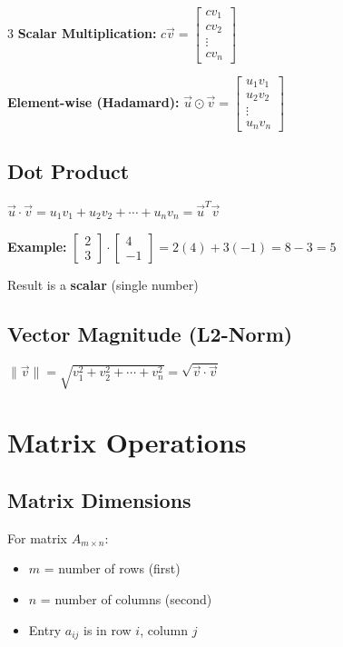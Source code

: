 \documentclass[10pt,landscape]{article}
\begin{document}
\begin{multicols*}{3}
\textbf{Scalar Multiplication:} $c\vec{v} = \begin{bmatrix} cv_1 \\ cv_2 \\ \vdots \\ cv_n \end{bmatrix}$

\textbf{Element-wise (Hadamard):} $\vec{u} \odot \vec{v} = \begin{bmatrix} u_1v_1 \\ u_2v_2 \\ \vdots \\ u_nv_n \end{bmatrix}$

\subsection*{Dot Product}
$\vec{u} \cdot \vec{v} = u_1v_1 + u_2v_2 + \cdots + u_nv_n = \vec{u}^T\vec{v}$

\textbf{Example:} $\begin{bmatrix} 2 \\ 3 \end{bmatrix} \cdot \begin{bmatrix} 4 \\ -1 \end{bmatrix} = 2(4) + 3(-1) = 8 - 3 = 5$

Result is a \textbf{scalar} (single number)

\subsection*{Vector Magnitude (L2-Norm)}
$\|\vec{v}\| = \sqrt{v_1^2 + v_2^2 + \cdots + v_n^2} = \sqrt{\vec{v} \cdot \vec{v}}$

\columnbreak

\section*{Matrix Operations}

\subsection*{Matrix Dimensions}
For matrix $A_{m \times n}$:
\begin{itemize}
    \item $m$ = number of rows (first)
    \item $n$ = number of columns (second)
    \item Entry $a_{ij}$ is in row $i$, column $j$
\end{itemize}


\end{multicols*}
\end{document}
